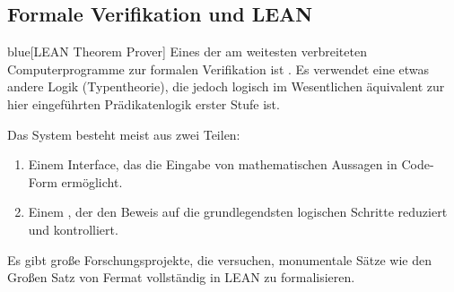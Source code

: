 \subsection{Formale Verifikation und LEAN}
\begin{math-stroke}
\begin{center}
\begin{color-box}{blue}[LEAN Theorem Prover]
Eines der am weitesten verbreiteten Computerprogramme zur formalen Verifikation ist . Es verwendet eine etwas andere Logik (Typentheorie), die jedoch logisch im Wesentlichen äquivalent zur hier eingeführten Prädikatenlogik erster Stufe ist.
\end{color-box}
\end{center}

\begin{explanation-of-steps}
Das System besteht meist aus zwei Teilen:
\begin{enumerate}[label=\textbf{(\arabic*)}]
    \item Einem Interface, das die Eingabe von mathematischen Aussagen in Code-Form ermöglicht.
    \item Einem , der den Beweis auf die grundlegendsten logischen Schritte reduziert und kontrolliert.
\end{enumerate}
Es gibt große Forschungsprojekte, die versuchen, monumentale Sätze wie den Großen Satz von Fermat vollständig in LEAN zu formalisieren.
\end{explanation-of-steps}
\end{math-stroke}

